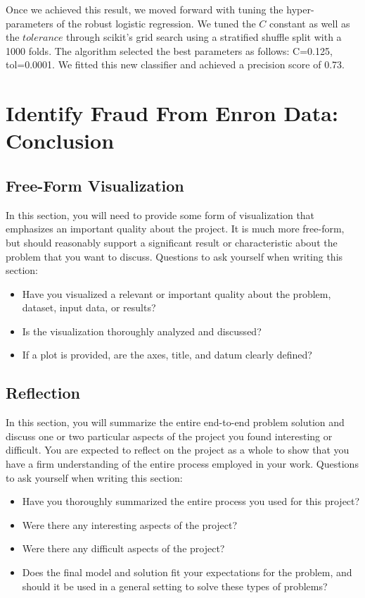 \documentclass[twoside,openright,titlepage,numbers=noenddot,headinclude,%
               footinclude=true,cleardoublepage=empty,abstractoff,BCOR=5mm,%
               paper=a4,fontsize=11pt,ngerman,american]{scrreprt}
\numberwithin{theorem}{chapter}
\numberwithin{definition}{chapter}
\numberwithin{algorithm}{chapter}
\numberwithin{figure}{chapter}
\numberwithin{table}{chapter}
\numberwithin{equation}{chapter}
\begin{document}
Once we achieved this result, we moved forward with tuning the hyper-parameters of the robust logistic regression. We tuned the $C$ constant as well as the $tolerance$ through scikit's grid search using a stratified shuffle split with a 1000 folds. The algorithm selected the best parameters as follows: C=0.125, tol=0.0001. We fitted this new classifier and achieved a precision score of 0.73.


\chapter*{Identify Fraud From Enron Data: Conclusion}

\section*{Free-Form Visualization}
In this section, you will need to provide some form of visualization that emphasizes an important quality about the project. It is much more free-form, but should reasonably support a significant result or characteristic about the problem that you want to discuss. Questions to ask yourself when writing this section:
\begin{itemize}%
\item Have you visualized a relevant or important quality about the problem, dataset, input data, or results?
\item Is the visualization thoroughly analyzed and discussed?
\item If a plot is provided, are the axes, title, and datum clearly defined?
\end{itemize}


\section*{Reflection}
In this section, you will summarize the entire end-to-end problem solution and discuss one or two particular aspects of the project you found interesting or difficult. You are expected to reflect on the project as a whole to show that you have a firm understanding of the entire process employed in your work. Questions to ask yourself when writing this section:
\begin{itemize}%
\item Have you thoroughly summarized the entire process you used for this project?
\item Were there any interesting aspects of the project?
\item Were there any difficult aspects of the project?
\item Does the final model and solution fit your expectations for the problem, and should it be used in a general setting to solve these types of problems?
\end{itemize}
\end{document}
